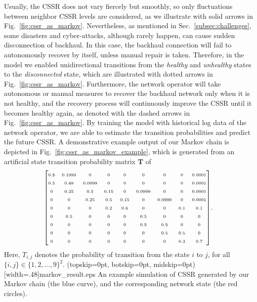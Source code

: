 \documentclass{ieeeaccess}
\newcommand{\change}[1]{#1}
\begin{document}
	Usually, the CSSR does not vary fiercely but smoothly, so only fluctuations between neighbor CSSR levels are considered, as we illustrate with solid arrows in Fig.~\ref{fig:cssr_as_markov}. Nevertheless, as mentioned in Sec.~\ref{subsec:challenges}, some disasters and cyber-attacks, although rarely happen, can cause sudden disconnection of \change{backhaul}. In this case, the backhaul connection will fail to autonomously recover by itself, unless manual repair is taken. Therefore, in the model we enabled unidirectional transitions from the \textit{healthy} and \textit{unhealthy} states to the \textit{disconnected} state, which are illustrated with dotted arrows in Fig.~\ref{fig:cssr_as_markov}. Furthermore, the network operator will take autonomous or manual measures to recover the backhaul network only when it is not healthy, and the recovery process will continuously improve the CSSR until it becomes healthy again, as denoted with the dashed arrows in Fig.~\ref{fig:cssr_as_markov}. By training the model with historical log data of the network operator, we are able to estimate the transition probabilities and predict the future CSSR. \change{A demonstrative example} output of our Markov chain is depicted in Fig.~\ref{fig:cssr_as_markov_example}, \change{which is generated from an artificial state transition probability matrix $\mathbf{T}$ of
		\begin{equation*}
		{\fontsize{6}{0}
		\begin{bmatrix}
		0.8&0.1999&0&0&0&0&0&0&0.0001\\
		0.5&0.49&0.0099&0&0&0&0&0&0.0001\\
		0&0.25&0.5&0.15&0&0.0999&0&0&0.0001\\
		0&0&0.25&0.5&0.15&0&0.0999&0&0.0001\\
		0&0&0&0.2&0.6&0&0&0.1&0.1\\
		0&0.5&0&0&0&0.5&0&0&0\\
		0&0&0&0&0&0.5&0.5&0&0\\
		0&0&0&0&0&0&0.5&0.5&0\\
		0&0&0&0&0&0&0&0.3&0.7\\
		\end{bmatrix}}.
		\end{equation*}
		Here, $T_{i,j}$ denotes the probability of transition from the state $i$ to $j$, for all $\{i,j\}\in\{1,2,\dots,9\}^2$.}
		\Figure[htbp!](topskip=0pt, botskip=0pt, midskip=0pt)[width=.48\textwidth]{markov_result.eps}
		{\change{An example simulation of CSSR generated by our Markov chain (the blue curve), and the corresponding network state (the red circles).}\label{fig:cssr_as_markov_example}}	
	
\end{document}
